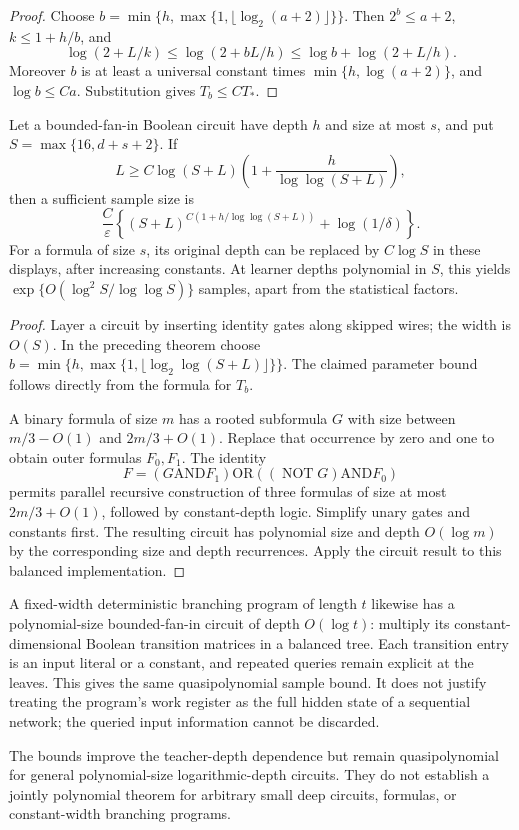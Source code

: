 \begin{proof}
Choose $b=\min\{h,\max\{1,\lfloor\log_2(a+2)\rfloor\}\}$.
Then $2^b\le a+2$, $k\le1+h/b$, and
\[
 \log(2+L/k)\le\log(2+bL/h)
                    \le\log b+\log(2+L/h).
\]
Moreover $b$ is at least a universal constant times
$\min\{h,\log(a+2)\}$, and $\log b\le C a$.
Substitution gives $T_b\le C T_*$.
\end{proof}

\begin{corollary}
\label{cor:critical-formula-blocking}
Let a bounded-fan-in Boolean circuit have depth $h$ and size at most
$s$, and put $S=\max\{16,d+s+2\}$. If
\[
 L\ge C\log(S+L)
                   \left(1+\frac{h}{\log\log(S+L)}\right),
\]
then a sufficient sample size is
\[
 \frac{C}{\varepsilon}
 \left\{(S+L)^{C(1+h/\log\log(S+L))}
                    +\log(1/\delta)\right\}.
\]
For a formula of size $s$, its original depth can be replaced by
$C\log S$ in these displays, after increasing constants.
At learner depths polynomial in $S$, this yields
$\exp\{O(\log^2S/\log\log S)\}$ samples, apart from the
statistical factors.
\end{corollary}

\begin{proof}
Layer a circuit by inserting identity gates along skipped wires;
the width is $O(S)$. In the preceding theorem choose
$b=\min\{h,\max\{1,\lfloor\log_2\log(S+L)\rfloor\}\}$.
The claimed parameter bound follows directly from the formula for
$T_b$.

A binary formula of size $m$ has a rooted subformula $G$ with size
between $m/3-O(1)$ and $2m/3+O(1)$. Replace that occurrence by
zero and one to obtain outer formulas $F_0,F_1$. The identity
\[
 F=(G\mathbin{\mathrm{AND}}F_1)
       \mathbin{\mathrm{OR}}
       ((\mathop{\mathrm{NOT}}G)\mathbin{\mathrm{AND}}F_0)
\]
permits parallel recursive construction of three formulas of size
at most $2m/3+O(1)$, followed by constant-depth logic. Simplify
unary gates and constants first. The resulting circuit has
polynomial size and depth $O(\log m)$ by the corresponding size
and depth recurrences. Apply the circuit result to this balanced
implementation.
\end{proof}

A fixed-width deterministic branching program of length $t$ likewise
has a polynomial-size bounded-fan-in circuit of depth $O(\log t)$:
multiply its constant-dimensional Boolean transition matrices in a
balanced tree. Each transition entry is an input literal or a constant,
and repeated queries remain explicit at the leaves. This gives the
same quasipolynomial sample bound. It does not justify treating the
program's work register as the full hidden state of a sequential
network; the queried input information cannot be discarded.

The bounds improve the teacher-depth dependence but remain
quasipolynomial for general polynomial-size logarithmic-depth circuits.
They do not establish a jointly polynomial theorem for arbitrary
small deep circuits, formulas, or constant-width branching programs.

